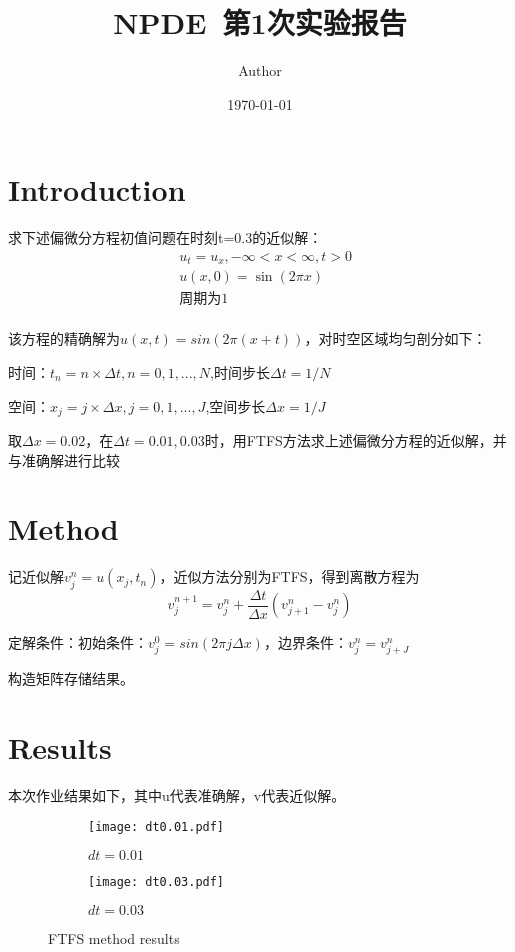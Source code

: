 \documentclass{article}
\title{NPDE~第1次实验报告}
\author{Author}
\date{\today}
\begin{document}
\maketitle

\section{Introduction}

求下述偏微分方程初值问题在时刻t=0.3的近似解：
$$
\begin{aligned}
  & u_t=u_x,-\infty<x<\infty,t>0 \\
  & u(x,0)=\sin(2\pi x)           \\
  & \text{周期为1}                  \\
\end{aligned}
$$

该方程的精确解为$u(x,t)=sin(2\pi(x+t))$，对时空区域均匀剖分如下：

时间：$t_n=n\times \Delta t,n=0,1,...,N$,时间步长$\Delta t=1/N$

空间：$x_j=j\times \Delta x,j=0,1,...,J$,空间步长$\Delta x=1/J$

取$\Delta x =0.02$，在$\Delta t=0.01,0.03$时，用FTFS方法求上述偏微分方程的近似解，并与准确解进行比较
\section{Method}

记近似解$v_j^n=u(x_j,t_n)$，近似方法分别为FTFS，得到离散方程为
$$v_j^{n+1}=v_j^n+\frac{\Delta t}{\Delta x}(v_{j+1}^n-v_{j}^n)$$

定解条件：初始条件：$v_j^0=sin(2\pi j\Delta x)$，边界条件：$v_j^n=v_{j+J}^n$

构造矩阵存储结果。
\section{Results}

本次作业结果如下，其中u代表准确解，v代表近似解。

\begin{figure}[H]
  \centering
  \begin{subfigure}[b]{0.47\textwidth}
    \centering
    \texttt{[image: dt0.01.pdf]}
    \caption{$dt=0.01$}

  \end{subfigure}
  \begin{subfigure}[b]{0.47\textwidth}
    \centering
    \texttt{[image: dt0.03.pdf]}
    \caption{$dt=0.03$}

  \end{subfigure}
  \caption{FTFS method results}
\end{figure}
\end{document}
